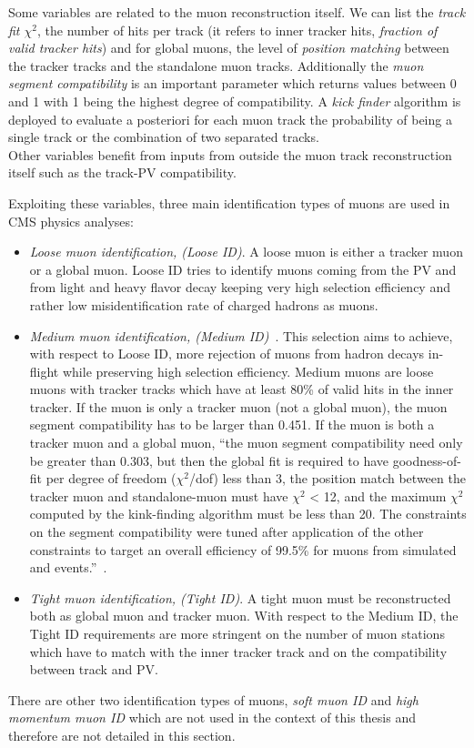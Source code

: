 Some variables are related to the muon reconstruction itself. We can
list the \emph{track fit $\chi^2$}, the number of hits per track (it refers
to inner tracker hits, \emph{fraction of valid tracker hits}) and for global muons, the
level of \emph{position matching} between the tracker tracks and the standalone muon
tracks. Additionally the \emph{muon segment
compatibility} is an important parameter which returns values between 0
and 1 with 1 being the highest degree of compatibility. A \emph{kick
  finder} algorithm is deployed to evaluate a posteriori for each muon
track the
probability of being a single track or the combination of two
separated tracks.  \\
Other variables benefit from inputs from outside the muon track
reconstruction itself such as the track-PV compatibility.

Exploiting these variables, three main identification types of muons
are used in CMS physics analyses:
\begin{itemize}
\setlength\itemsep{-0.2em}
\item \emph{Loose muon identification, (Loose ID)}. A loose muon is either a
  tracker muon or a global muon. Loose ID tries to identify muons
  coming from the PV and from light and heavy flavor decay keeping
  very high selection efficiency and rather low misidentification rate
  of charged hadrons as muons. 
\item \emph{Medium muon identification, (Medium
    ID)}~\cite{PetruccianiBotta}. This selection aims to achieve, with
  respect to Loose ID, more rejection	
of muons from hadron decays in-flight while preserving
high selection efficiency. Medium muons are loose muons with tracker
tracks which have at least 80\% of valid hits in the inner tracker. 
If the muon is only a tracker muon (not a global muon), the muon
segment compatibility has to be larger than
0.451. If the muon is both a tracker muon and a global muon, ``the
muon segment compatibility need only be greater than 0.303, but then the global fit
is required to have goodness-of-fit per degree of freedom ($\chi^2$/dof) less than 3, the
position match between the tracker muon and standalone-muon must have $\chi^2$ < 12,
and the maximum $\chi^2$ computed by the kink-finding algorithm must be less than 20.
The constraints on the segment compatibility were tuned after application of the
other constraints to target an overall efficiency of 99.5\% for muons from simulated
\PW and \PZ events.''~\cite{Sirunyan_2018_muon}.
\item \emph{Tight muon identification, (Tight ID)}. A tight muon must
  be reconstructed both as global muon and tracker muon. With respect
  to the Medium ID, the Tight ID requirements are more stringent on
  the number of muon stations which have to match with the inner
  tracker track and on the compatibility between track and PV. 
\end{itemize}
There are other two identification types of muons, \emph{soft muon ID}
and \emph{high momentum muon ID} which are not used in the context of
this thesis and therefore are not detailed in this section. 


